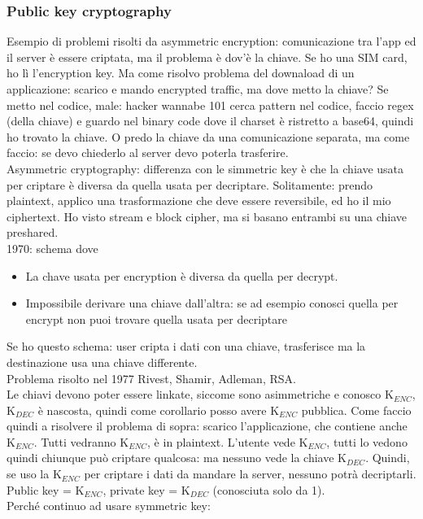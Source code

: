 \documentclass[16px]{article}
\begin{document}
\subsubsection{Public key cryptography}
Esempio di problemi risolti da asymmetric encryption: comunicazione tra l'app ed il server è essere criptata, ma il problema è dov'è la chiave. Se ho una SIM card, ho lì l'encryption key. Ma come risolvo problema del downaload di un applicazione: scarico e mando encrypted traffic, ma dove metto la chiave? Se metto nel codice, male: hacker wannabe 101 cerca pattern nel codice, faccio regex (della chiave) e guardo nel binary code dove il charset è ristretto a base64, quindi ho trovato la chiave. O predo la chiave da una comunicazione separata, ma come faccio: se devo chiederlo al server devo poterla trasferire.\\ Asymmetric cryptography: differenza con le simmetric key è che la chiave usata per criptare è diversa da quella usata per decriptare. Solitamente: prendo plaintext, applico una trasformazione che deve essere reversibile, ed ho il mio ciphertext. Ho visto stream e block cipher, ma si basano entrambi su una chiave preshared.\\ 1970: schema dove
\begin{itemize}
\item La chave usata per encryption è diversa da quella per decrypt.
\item Impossibile derivare una chiave dall'altra: se ad esempio conosci quella per encrypt non puoi trovare quella usata per decriptare
\end{itemize}
Se ho questo schema: user cripta i dati con una chiave, trasferisce ma la destinazione usa una chiave differente.\\ Problema risolto nel 1977 Rivest, Shamir, Adleman, RSA.\\ Le chiavi devono poter essere linkate, siccome sono asimmetriche e conosco K$_{ENC}$, K$_{DEC}$ è nascosta, quindi come corollario posso avere K$_{ENC}$ pubblica. Come faccio quindi a risolvere il problema di sopra: scarico l'applicazione, che contiene anche K$_{ENC}$. Tutti vedranno K$_{ENC}$, è in plaintext. L'utente vede K$_{ENC}$, tutti lo vedono quindi chiunque può criptare qualcosa: ma nessuno vede la chiave K$_{DEC}$. Quindi, se uso la K$_{ENC}$ per criptare i dati da mandare la server, nessuno potrà decriptarli.\\ Public key = K$_{ENC}$, private key = K$_{DEC}$ (conosciuta solo da 1).\\ Perché continuo ad usare symmetric key:
\end{document}
